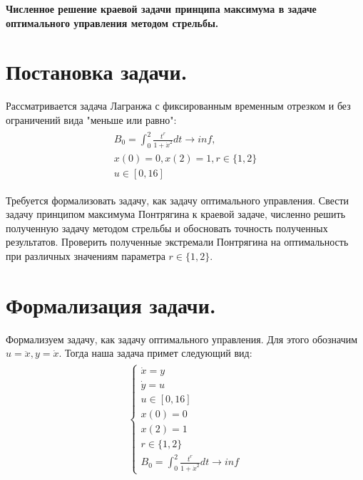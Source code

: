 \documentclass[a4paper,12pt]{article}
\begin{document}
\begin{center}
\textbf{
Численное решение краевой задачи принципа максимума в задаче оптимального управления методом стрельбы.
}
\end{center}





\section{Постановка задачи.}
Рассматривается задача Лагранжа с фиксированным временным отрезком и без ограничений вида "меньше или равно":
\begin{align}
\begin{align*}
    B_0=\int_0^2\frac{t^r}{1+{\dot x}^2} {dt} \rightarrow {inf} ,\\
    x(0)=0 ,x(2)=1 ,r \in \{1, 2\}\\
    u \in \left[0,16\right] 
\end{align*}
\end{align}

Требуется формализовать задачу, как задачу оптимального управления. Свести задачу принципом максимума Понтрягина к краевой задаче, численно решить полученную задачу методом стрельбы и обосновать точность полученных результатов. Проверить полученные экстремали Понтрягина на оптимальность при различных значениям параметра $r \in \{1, 2\}.$





\section{Формализация задачи.}
Формализуем задачу, как задачу оптимального управления. Для этого обозначим $u= \ddot x, y=\dot x $. Тогда наша задача примет следующий вид:
\begin{align}
\begin{align*}
    \left\{
        \begin{array}{l}
            {\dot x}=y
            \\
            {\dot y}=u
            \\
            u \in \left[0, 16\right]
            \\
            x(0)=0
            \\
            x(2)=1
            \\
            r \in \{1, 2\}
            \\
            B_0=\int_0^2\frac{t^r}{1+{\dot x}^2} {dt} \rightarrow {inf}
        \end{array}
    \right. 
\end{align*}
\end{align}
\end{document}
